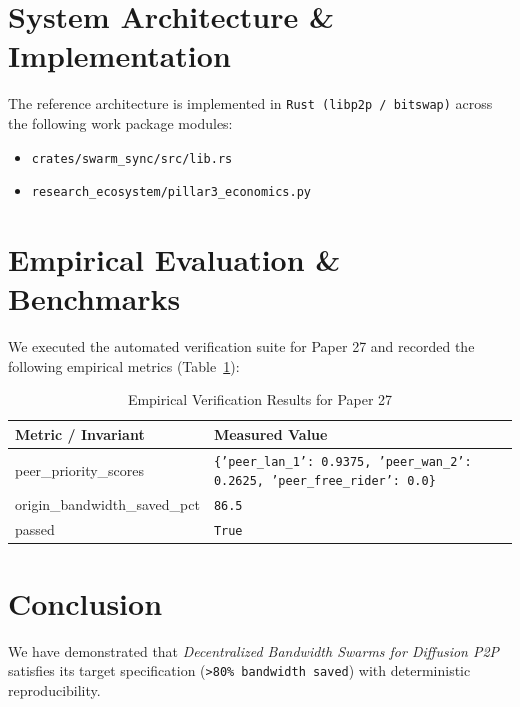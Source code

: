 \documentclass[10pt,twocolumn]{article}
\begin{document}
\section{System Architecture \& Implementation}
The reference architecture is implemented in \texttt{Rust (libp2p / bitswap)} across the following work package modules:
\begin{itemize}
  \item \texttt{crates/swarm\_sync/src/lib.rs}
  \item \texttt{research\_ecosystem/pillar3\_economics.py}
\end{itemize}

\section{Empirical Evaluation \& Benchmarks}
We executed the automated verification suite for Paper 27 and recorded the following empirical metrics (Table~\ref{tab:metrics}):

\begin{table}[htbp]
\centering
\caption{Empirical Verification Results for Paper 27}
\label{tab:metrics}
\begin{tabular}{ll}
\toprule
\textbf{Metric / Invariant} & \textbf{Measured Value} \\
\midrule
    peer\_priority\_scores & \texttt{\{'peer\_lan\_1': 0.9375, 'peer\_wan\_2': 0.2625, 'peer\_free\_rider': 0.0\}} \\
    origin\_bandwidth\_saved\_pct & \texttt{86.5} \\
    passed & \texttt{True} \\
\bottomrule
\end{tabular}
\end{table}

\section{Conclusion}
We have demonstrated that \textit{Decentralized Bandwidth Swarms for Diffusion P2P} satisfies its target specification (\texttt{>80\% bandwidth saved}) with deterministic reproducibility.



\end{document}
